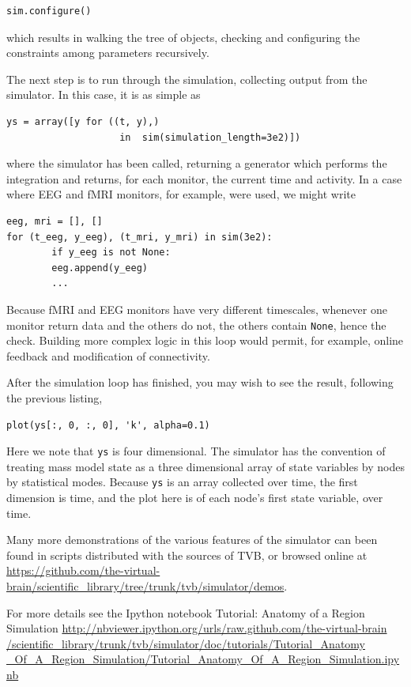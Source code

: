 \begin{lstlisting}
sim.configure()
\end{lstlisting}

which results in walking the tree of objects, checking and 
configuring the constraints among parameters recursively.

The next step is to run through the simulation, collecting
output from the simulator. In this case, it is as simple as
\begin{lstlisting}
ys = array([y for ((t, y),) 
					in  sim(simulation_length=3e2)])
\end{lstlisting}
\noindent where the simulator has been called, returning a 
generator which performs the integration and returns, for each
monitor, the current time and activity. In a case where EEG 
and fMRI monitors, for example, were used, we might write
\begin{lstlisting}
eeg, mri = [], []
for (t_eeg, y_eeg), (t_mri, y_mri) in sim(3e2):
		if y_eeg is not None:
		eeg.append(y_eeg)
		...
\end{lstlisting}
\noindent Because fMRI and EEG monitors have very different
timescales, whenever one monitor return data and the others do
not, the others contain \texttt{None}, hence the check. Building
more complex logic in this loop would permit, for example, online
feedback and modification of connectivity. 

After the simulation loop has finished, you may wish to see the
result, following the previous listing, 
\begin{lstlisting}
plot(ys[:, 0, :, 0], 'k', alpha=0.1)
\end{lstlisting}
\noindent Here we note that \texttt{ys} is four dimensional. The 
simulator has the convention of treating  mass model state as a
three dimensional array of state variables by nodes by statistical
modes. Because \texttt{ys} is an array collected over time, the first
dimension is time, and the plot here is of each node's first state
variable, over time.

Many more demonstrations of the various features of the simulator
can been found in scripts distributed with the sources of TVB, or 
browsed online at \url{https://github.com/the-virtual-brain/scientific_library/tree/trunk/tvb/simulator/demos}.

For more details see the Ipython notebook Tutorial: Anatomy of a Region Simulation 
\url{http://nbviewer.ipython.org/urls/raw.github.com/the-virtual-brain
/scientific_library/trunk/tvb/simulator/doc/tutorials/Tutorial_Anatomy
_Of_A_Region_Simulation/Tutorial_Anatomy_Of_A_Region_Simulation.ipynb}

